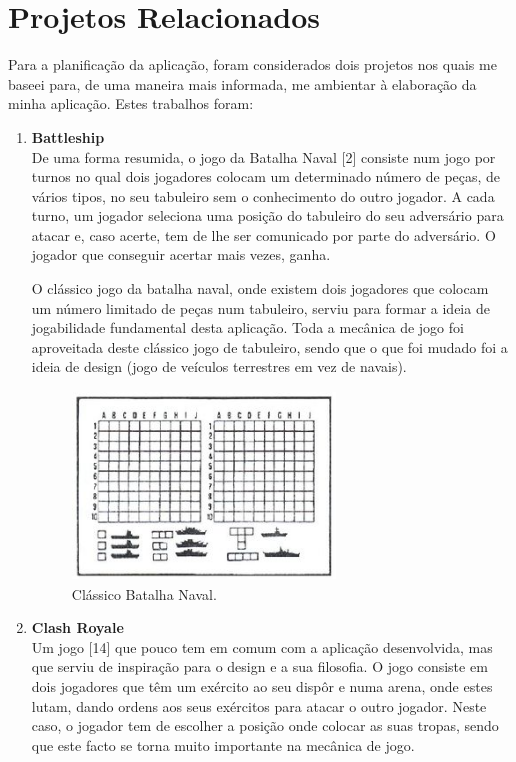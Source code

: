 \section{Projetos Relacionados}
\label{chap2:sec:PRL}
Para a planificação da aplicação, foram considerados dois projetos nos quais me baseei para, de uma maneira mais informada, me ambientar à elaboração da minha aplicação. Estes trabalhos foram: 
\begin{enumerate}
    \item \textbf{Battleship}\\
    De uma forma resumida, o jogo da Batalha Naval [2] consiste num jogo por turnos no qual dois jogadores colocam um determinado número de peças, de vários tipos, no seu tabuleiro sem o conhecimento do outro jogador.
    A cada turno, um jogador seleciona uma posição do tabuleiro do seu adversário para atacar e, caso acerte, tem de lhe ser comunicado por parte do adversário. O jogador que conseguir acertar mais vezes, ganha.

    O clássico jogo da batalha naval, onde existem dois jogadores que colocam um número limitado de peças num tabuleiro, serviu para formar a ideia de jogabilidade fundamental desta aplicação. Toda a mecânica de jogo foi aproveitada deste clássico jogo de tabuleiro, sendo que o que foi mudado foi a ideia de design (jogo de veículos terrestres em vez de navais).

\begin{figure}[!h]
  \includegraphics[width=7cm, height=5cm]{Batalhanaval.jpg}
  \centering
  \caption{Clássico Batalha Naval.}
  \label{fig:batalhanaval}
\end{figure}
   
    
    \item \textbf{Clash Royale}\\
    Um jogo [14] que pouco tem em comum com a aplicação desenvolvida, mas que serviu de inspiração para o design e a sua filosofia. O jogo consiste em dois jogadores que têm um exército ao seu dispôr e numa arena, onde estes lutam, dando ordens aos seus exércitos para atacar o outro jogador.
    Neste caso, o jogador tem de escolher a posição onde colocar as suas tropas, sendo que este facto se torna muito importante na mecânica de jogo. 


\end{enumerate}
